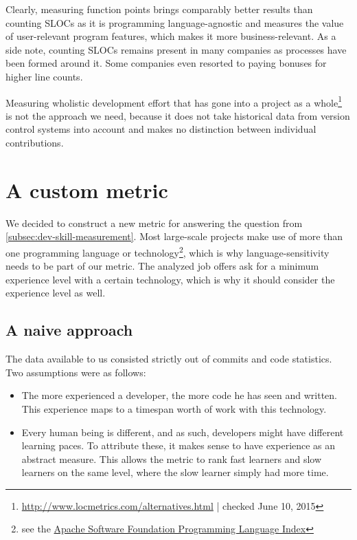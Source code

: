 Clearly, measuring function points brings comparably better results than counting SLOCs as it is programming language-agnostic and measures the value of user-relevant program features, which makes it more business-relevant. As a side note, counting SLOCs remains present in many companies as processes have been formed around it. Some companies even resorted to paying bonuses for higher line counts\cite{am:2009}.
\newline

Measuring wholistic development effort that has gone into a project as a whole\footnote{\url{http://www.locmetrics.com/alternatives.html} | checked June 10, 2015} is not the approach we need, because it does not take historical data from version control systems into account and makes no distinction between individual contributions.

\section{A custom metric}
We decided to construct a new metric for answering the question from \ref{subsec:dev-skill-measurement}. Most large-scale projects make use of more than one programming language or technology\footnote{see \eg the \href{http://projects.apache.org/indexes/language.html}{Apache Software Foundation Programming Language Index}}, which is why language-sensitivity needs to be part of our metric. The analyzed job offers ask for a minimum experience level with a certain technology, which is why it should consider the experience level as well.

\subsection{A naive approach}
The data available to us consisted strictly out of commits and code statistics. Two assumptions were as follows:

\begin{itemize}
 \item The more experienced a developer, the more code he has seen and written. This experience maps to a timespan worth of work with this technology.
 \item Every human being is different, and as such, developers might have different learning paces. To attribute these, it makes sense to have experience as an abstract measure. This allows the metric to rank fast learners and slow learners on the same level, where the slow learner simply had more time.
\end{itemize}

